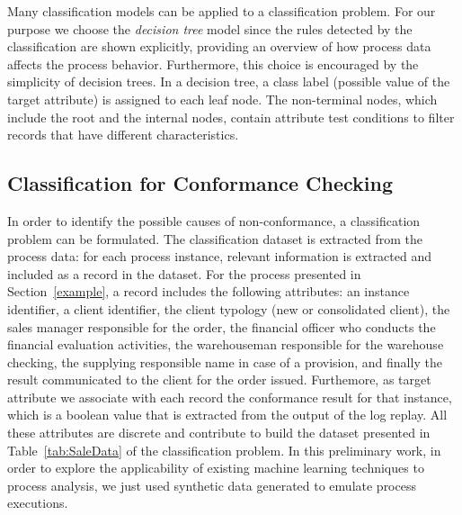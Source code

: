 \documentclass{llncs}
\begin{document}
Many classification models can be applied to a classification
problem. For our purpose we choose the \emph{decision tree} model
since the rules detected by the classification are shown explicitly,
providing an overview of how process data affects the
process behavior. Furthermore, this choice is encouraged by the simplicity of decision trees. In a decision tree, a class label (possible value of the target attribute) is assigned to each leaf node. The non-terminal nodes, which include the root and the internal nodes, contain attribute test conditions to filter records that have different characteristics.

\subsection{Classification for Conformance Checking}\label{ClassConformance}
In order to identify the possible causes of non-conformance, a
classification problem can be formulated. The classification dataset
is extracted from the process data: for each process instance,
relevant information is  extracted and included as a record in the
dataset.
For the process presented in Section~\ref{example}, a record includes 
the following attributes: an instance identifier, a 
client identifier, the client typology (new or consolidated client),
the sales manager responsible for the order, the financial officer who
conducts the financial evaluation activities, the warehouseman
responsible for the warehouse checking, the supplying responsible name
in case of a provision, and finally the result communicated to the
client for the order issued. Furthemore, as target attribute 
we associate with each record the conformance result for that instance, 
which is a boolean value that is extracted from the output of the log replay.
All these attributes are discrete and contribute to build the dataset
presented in Table~\ref{tab:SaleData} of the classification
problem. In this preliminary work, 
in order to 
explore the applicability
of existing machine learning  techniques to process analysis,
we just used synthetic data
generated to emulate process executions.
\end{document}

